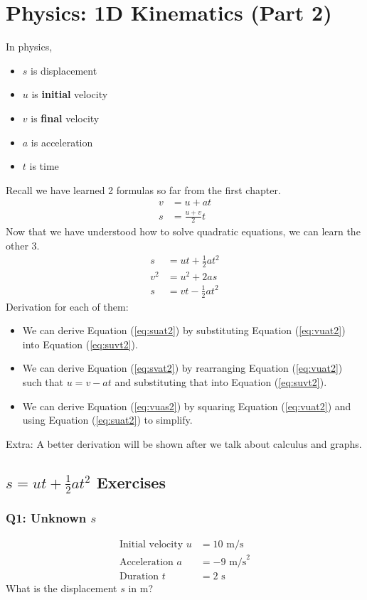 \documentclass{article}
\begin{document}
\section{Physics: 1D Kinematics (Part 2)}
In physics, 
\begin{itemize}
    \item $s$ is displacement 
    \item $u$ is \textbf{initial} velocity 
    \item $v$ is \textbf{final} velocity
    \item $a$ is acceleration
    \item $t$ is time
\end{itemize}
Recall we have learned 2 formulas so far from the first chapter. 
\begin{align}
    v &= u + at \label{eq:vuat2} \\
    s &= \frac{u+v}{2} t \label{eq:suvt2}
\end{align}
Now that we have understood how to solve quadratic equations, we can learn the other 3.
\begin{align}
s & =u t+\frac{1}{2} a t^2 \label{eq:suat2} \\
v^2 & =u^2+2 a s \label{eq:vuas2} \\
s & =v t-\frac{1}{2} a t^2 \label{eq:svat2}
\end{align}
Derivation for each of them:
\begin{itemize}
    \item We can derive Equation (\ref{eq:suat2}) by substituting Equation (\ref{eq:vuat2}) into Equation (\ref{eq:suvt2}). 
    \item We can derive Equation (\ref{eq:svat2}) by rearranging Equation (\ref{eq:vuat2}) such that $u=v-at$ and substituting that into Equation (\ref{eq:suvt2}). 
    \item We can derive Equation (\ref{eq:vuas2}) by squaring Equation (\ref{eq:vuat2}) and using Equation (\ref{eq:suat2}) to simplify.
\end{itemize}
\noindent Extra: A better derivation will be shown after we talk about calculus and graphs.
\clearpage
\subsection{$s=ut + \frac{1}{2} at^2$ Exercises}
\subsubsection{Q1: Unknown $s$}
\begin{align}
\text{Initial velocity } u&=10 \text{ m/s}\\
\text{Acceleration }a&=-9 \text{ m/s}^2\\
\text{Duration }t&=2 \text{ s}
\end{align}
What is the displacement $s$ in $\text{m}$?
\end{document}
